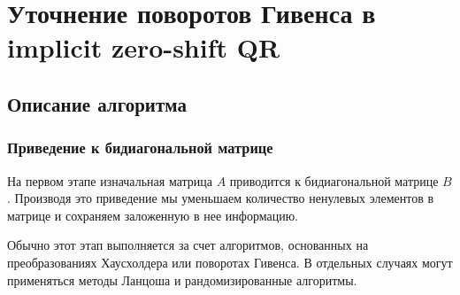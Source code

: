 

\section{Уточнение поворотов Гивенса в implicit zero-shift QR}

\subsection{Описание алгоритма}

\subsubsection{Приведение к бидиагональной матрице}

На первом этапе изначальная матрица $A$ приводится к бидиагональной матрице $B$. Производя это приведение мы уменьшаем количество ненулевых элементов в матрице и сохраняем заложенную в нее информацию.

Обычно этот этап выполняется за счет алгоритмов, основанных на преобразованиях Хаусхолдера или поворотах Гивенса. В отдельных случаях могут применяться методы Ланцоша и рандомизированные алгоритмы. 

